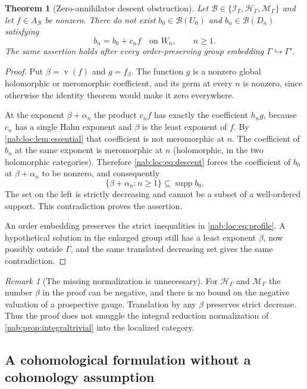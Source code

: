 \documentclass[11pt,letterpaper]{article}
\newtheorem{theorem}{Theorem}[section]
\theoremstyle{definition}
\theoremstyle{remark}
\newtheorem{remark}[remark]{Remark}
\newcommand{\HH}{\mathscr H_\Gamma}
\newcommand{\II}{\mathscr I_\Gamma}
\newcommand{\supp}{\operatorname{supp}}
\newcommand{\val}{\operatorname{v}}
\newcommand{\MM}{\mathscr M_\Gamma}
\newcommand{\BB}{\mathscr B}
\newcommand{\Aglob}{A_{\BB}}
\numberwithin{equation}{section}
\begin{document}
\begin{theorem}[Zero-annihilator descent obstruction]\label{nab:loc:thm:obstruction}
Let $\BB\in\{\II,\HH,\MM\}$ and let $f\in\Aglob$ be nonzero. There do not exist
$b_0\in\BB(U_0)$ and $b_n\in\BB(D_n)$ satisfying
\begin{equation}\label{nab:loc:eq:descent}
 b_n=b_0+c_nf\quad\text{on }W_n,\qquad n\geq1.
\end{equation}
The same assertion holds after every order-preserving group embedding
$\Gamma\hookrightarrow\Gamma'$.
\end{theorem}

\begin{proof}
Put $\beta=\val(f)$ and $g=f_\beta$. The function $g$ is a nonzero global
holomorphic or meromorphic coefficient, and its germ at every $n$ is nonzero,
since otherwise the identity theorem would make it zero everywhere.

At the exponent $\beta+\alpha_n$ the product $c_nf$ has exactly the
coefficient $h_ng$, because $c_n$ has a single Hahn exponent and $\beta$ is
the least exponent of $f$. By \cref{nab:loc:lem:essential} that coefficient is
not meromorphic at $n$. The coefficient of $b_n$ at the same exponent is
meromorphic at $n$ (holomorphic, in the two holomorphic categories). Therefore
\eqref{nab:loc:eq:descent} forces the coefficient of $b_0$ at $\beta+\alpha_n$
to be nonzero, and consequently
\[
 \{\beta+\alpha_n:n\geq1\}\subseteq\supp b_0.
\]
The set on the left is strictly decreasing and cannot be a subset of a
well-ordered support. This contradiction proves the assertion.

An order embedding preserves the strict inequalities in
\eqref{nab:loc:eq:profile}. A hypothetical solution in the enlarged group still
has a least exponent $\beta$, now possibly outside $\Gamma$, and the same
translated decreasing set gives the same contradiction.
\end{proof}

\begin{remark}[The missing normalization is unnecessary]\label{nab:loc:rem:nonegative}
For $\HH$ and $\MM$ the number $\beta$ in the proof can be negative, and there
is no bound on the negative valuation of a prospective gauge. Translation by
any $\beta$ preserves strict decrease. Thus the proof does not smuggle the
integral reduction normalization of \cref{nab:prop:integraltrivial} into the
localized category.
\end{remark}

\subsection{A cohomological formulation without a cohomology assumption}
\end{document}
